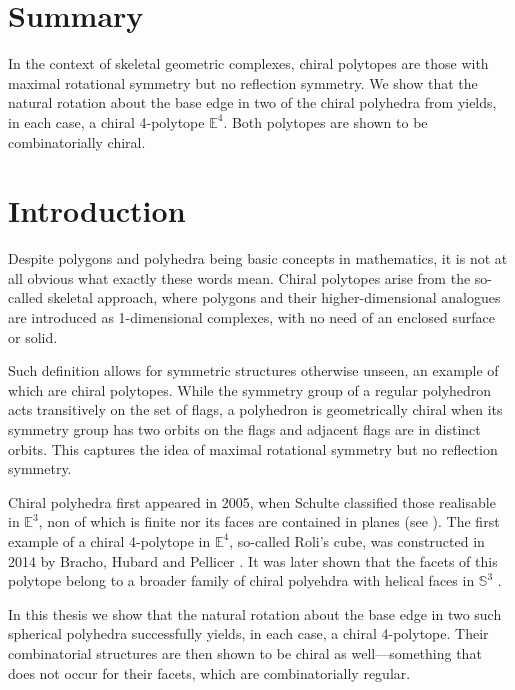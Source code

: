 \documentclass{article}
\theoremstyle{definition}
\newcommand{\E}{\mathbb{E}}
\begin{document}
	
	\section*{Summary}
	In the context of skeletal geometric complexes, chiral polytopes are those with maximal rotational symmetry but no reflection symmetry. We show that the natural rotation about the base edge in two of the chiral polyhedra from \cite{petcox} yields, in each case, a chiral 4-polytope $\E^4$. Both polytopes are shown to be combinatorially chiral.
	
	\vspace{1cm}
		\tableofcontents
		\clearpage
	\section{Introduction}
	Despite polygons and polyhedra being basic concepts in mathematics,
	 it is not at all obvious what exactly these words mean. Chiral polytopes arise from the so-called skeletal approach, where polygons and their higher-dimensional analogues are introduced as 1-dimensional complexes, with no need of an enclosed surface or solid.
	
	Such definition allows for symmetric structures otherwise unseen, an example of which are chiral polytopes. While the symmetry group of a regular polyhedron acts transitively on the set of flags, a polyhedron is geometrically chiral when its symmetry group has two orbits on the flags and adjacent flags are in distinct orbits. This captures the idea of maximal rotational symmetry but no reflection symmetry.
	
	Chiral polyhedra first appeared in 2005, when Schulte classified those realisable in $\E^3$, non of which is finite nor its faces are contained in planes (see \cite{chiral-polyhedra-i,chiral-polyhedra-ii}). The first example of a chiral 4-polytope in $\E^4$, so-called Roli's cube, was constructed in 2014 by Bracho, Hubard and Pellicer \cite{rolis-cube}. It was later shown that the facets of this polytope belong to a broader family of chiral polyehdra with helical faces in $\mathbb{S}^3$ \cite{petcox}.
	
	In this thesis we show that the natural rotation about the base edge in two such spherical polyhedra successfully yields, in each case, a chiral 4-polytope. Their combinatorial structures are then shown to be chiral as well---something that does not occur for their facets, which are combinatorially regular.
	
\end{document}
